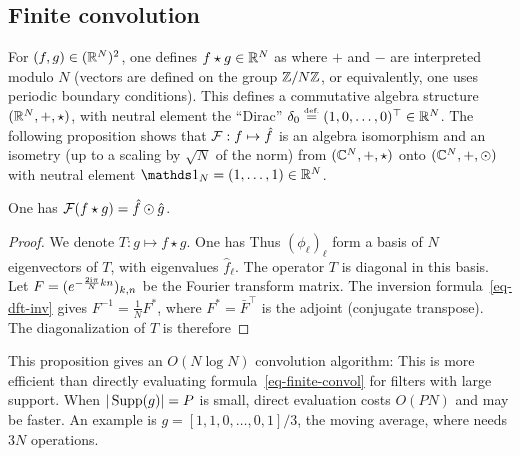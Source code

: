\subsection{Finite convolution}

For $(f,g) \in (\mathbb{R}^{N})^2$, one defines $f\star g \in \mathbb{R}^N$ as
where $+$ and $-$ are interpreted modulo $N$ (vectors are defined on the group $\mathbb{Z}/N\mathbb{Z}$, or equivalently, one uses periodic boundary conditions).
%
This defines a commutative algebra structure $(\mathbb{R}^N,+,\star)$, with neutral element the ``Dirac'' $\delta_0 \stackrel{\mbox{\upshape\tiny def.}}{=} (1,0,\ldots,0)^\top \in \mathbb{R}^N$. The following proposition shows that $\mathcal{F} : f \mapsto \hat f$ is an algebra isomorphism and an isometry (up to a scaling by $\sqrt{N}$ of the norm) from $(\mathbb{C}^N,+,\star)$ onto $(\mathbb{C}^N,+,\odot)$ with neutral element $\ones_N=(1,\ldots,1) \in \RR^N$.

\begin{prop}\label{prop-tfd-conv}
	One has $\mathcal{F}( f \star g ) = \hat f \odot \hat g$. 
\end{prop}
\begin{proof}
	We denote $T : g \mapsto f \star g$. One has 
	Thus $(\phi_\ell)_\ell$ form a basis of $N$ eigenvectors of $T$, with eigenvalues $\hat f_\ell$. The operator $T$ is diagonal in this basis. Let $F=(  e^{ -\frac{2\mathrm{i}\pi}{N} k n } )_{k,n}$ be the Fourier transform matrix. The inversion formula~\eqref{eq-dft-inv} gives $F^{-1} = \frac{1}{N}F^*$, where $F^*=\bar F^\top$ is the adjoint (conjugate transpose). The diagonalization of $T$ is therefore
\end{proof}

This proposition gives an $O(N\log N)$ convolution algorithm:
This is more efficient than directly evaluating formula~\eqref{eq-finite-convol} for filters with large support. When $|\operatorname{Supp}(g)|=P$ is small, direct evaluation costs $O(PN)$ and may be faster. An example is $g=[1,1,0,\ldots,0,1]/3$, the moving average, where
needs $3N$ operations.


